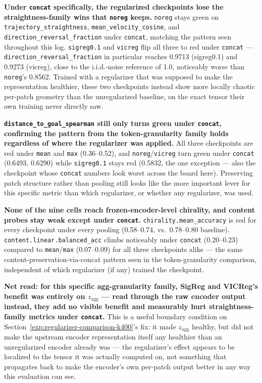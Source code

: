 \textbf{Under \texttt{concat} specifically, the regularized checkpoints lose the
straightness-family wins that \texttt{noreg} keeps.} \texttt{noreg} stays green on
\texttt{trajectory\_straightness}, \texttt{mean\_velocity\_cosine}, and
\texttt{direction\_reversal\_fraction} under \texttt{concat}, matching the pattern seen
throughout this log. \texttt{sigreg0.1} and \texttt{vicreg} flip all three to red under
\texttt{concat} --- \texttt{direction\_reversal\_fraction} in particular reaches
0.9713 (sigreg0.1) and 0.9273 (vicreg), close to the i.i.d.-noise reference of 1.0,
noticeably worse than \texttt{noreg}'s 0.8562. Trained with a regularizer that was
supposed to make the representation healthier, these two checkpoints instead show more
locally chaotic per-patch geometry than the unregularized baseline, on the exact tensor
their own training never directly saw.

\textbf{\texttt{distance\_to\_goal\_spearman} still only turns green under
\texttt{concat}, confirming the pattern from the token-granularity family holds
regardless of where the regularizer was applied.} All three checkpoints are red under
\texttt{mean} and \texttt{max} (0.36--0.52), and \texttt{noreg}/\texttt{vicreg} turn
green under \texttt{concat} (0.6493, 0.6290) while \texttt{sigreg0.1} stays red (0.5832,
the one exception --- also the checkpoint whose \texttt{concat} numbers look worst
across the board here). Preserving patch structure rather than pooling still looks like
the more important lever for this specific metric than which regularizer, or whether
any regularizer, was used.

\textbf{None of the nine cells reach frozen-encoder-level chirality, and content probes
stay weak except under \texttt{concat}.} \texttt{chirality.mean\_accuracy} is red for
every checkpoint under every pooling (0.58--0.74, vs.\ 0.78--0.80 baseline).
\texttt{content.linear.balanced\_acc} climbs noticeably under \texttt{concat}
(0.20--0.23) compared to \texttt{mean}/\texttt{max} (0.07--0.09) for all three
checkpoints alike --- the same content-preservation-via-concat pattern seen in the
token-granularity comparison, independent of which regularizer (if any) trained the
checkpoint.

\textbf{Net read: for this specific agg-granularity family, SigReg and VICReg's benefit
was entirely on $z_{\mathrm{agg}}$ --- read through the raw encoder output instead, they
add no visible benefit and measurably hurt straightness-family metrics under
\texttt{concat}.} This is a useful boundary condition on Section~\ref{exp:regularizer-comparison-k400}'s
fix: it made $z_{\mathrm{agg}}$ healthy, but did not make the upstream encoder
representation itself any healthier than an unregularized encoder already was --- the
regularizer's effect appears to be localized to the tensor it was actually computed on,
not something that propagates back to make the encoder's own per-patch output better in
any way this evaluation can see.
